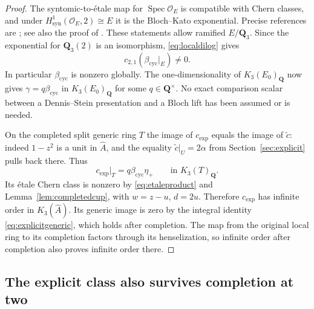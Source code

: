 \documentclass[11pt,a4paper]{article}
\theoremstyle{remark}
\newcommand{\Q}{\mathbf Q}
\newcommand{\OO}{\mathcal O}
\newcommand{\Spec}{\operatorname{Spec}}
\begin{document}
\begin{proof}
The syntomic-to-\'etale map for $\Spec\OO_E$ is compatible with Chern classes, and under $H^1_{\mathrm{syn}}(\OO_E,2)\cong E$ it is the Bloch--Kato exponential. Precise references are \cite[Example~2.2.4 and Propositions~2.2.7, 2.2.9, 2.3.4]{HuberKings}; see also the proof of \cite[Corollary~5.19]{Tamme}. These statements allow ramified $E/\Q_3$. Since the exponential for $\Q_3(2)$ is an isomorphism, \eqref{eq:localdilog} gives
\[
c_{2,1}(\beta_{\mathrm{cyc}}|_E)\ne0.
\]
In particular $\beta_{\mathrm{cyc}}$ is nonzero globally. The one-dimensionality of $K_3(E_0)_{\Q}$ now gives $\gamma=q\beta_{\mathrm{cyc}}$ in $K_3(E_0)_{\Q}$ for some $q\in\Q^\times$. No exact comparison scalar between a Dennis--Stein presentation and a Bloch lift has been assumed or is needed.

On the completed split generic ring $T$ the image of $c_{\mathrm{exp}}$ equals the image of $\widetilde c$: indeed $1-z^2$ is a unit in $\widehat A$, and the equality $\widetilde c|_U=2\alpha$ from Section~\ref{sec:explicit} pulls back there. Thus
\[
c_{\mathrm{exp}}|_T=q\beta_{\mathrm{cyc}}\eta_+\qquad\text{in }K_3(T)_{\Q}.
\]
Its \'etale Chern class is nonzero by \eqref{eq:etaleproduct} and Lemma~\ref{lem:completedcup}, with $w=z-u$, $d=2u$. Therefore $c_{\mathrm{exp}}$ has infinite order in $K_3(\widehat A)$. Its generic image is zero by the integral identity \eqref{eq:explicitgeneric}, which holds after completion. The map from the original local ring to its completion factors through its henselization, so infinite order after completion also proves infinite order there.
\end{proof}

\subsection{The explicit class also survives completion at two}
\label{sec:explicittwocomplete}
\end{document}
